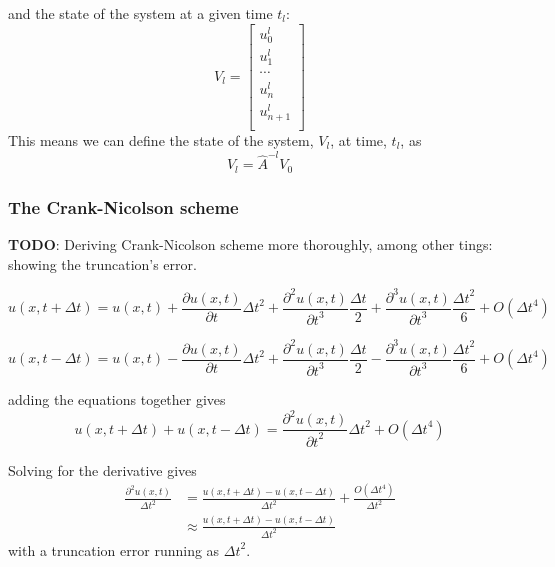 \documentclass[10pt,a4paper]{article}
\newcommand{\dt}{{\Delta t}}
\newcommand{\pt}{{\partial t}}
\newcommand{\pu}{{\partial u}}
\newcommand{\ppu}{{\partial^2 u}}
\newcommand{\pppu}{{\partial^3 u}}
\begin{document}
and the state of the system at a given time $t_l$:
\begin{equation}\label{eqn:V} V_l = \begin{bmatrix}
u_{0}^l\\
u_{1}^l\\
\cdots\\
u_{n}^l\\
u_{n+1}^l\\
\end{bmatrix}
\end{equation}
This means we can define the state of the system, $V_l$, at time, $t_l$, as
\begin{equation}
V_l = \hat{A}^{-l}V_0
\end{equation}



\subsubsection{The Crank-Nicolson scheme}
\textbf{TODO}: Deriving Crank-Nicolson scheme more thoroughly, among other tings: showing the truncation's error.

\begin{equation}
u(x,t+\dt) = u(x,t) + \frac{\pu(x,t)}{\pt}\dt^2 + \frac{\ppu(x,t)}{\pt^3}\frac{\dt}{2} + \frac{\pppu(x,t)}{\pt^3}\frac{\dt^2}{6} + O(\dt^4)
\end{equation}

\begin{equation}
u(x,t-\dt) = u(x,t) - \frac{\pu(x,t)}{\pt}\dt^2 + \frac{\ppu(x,t)}{\pt^3}\frac{\dt}{2} - \frac{\pppu(x,t)}{\pt^3}\frac{\dt^2}{6} + O(\dt^4)
\end{equation}

adding the equations together gives
\begin{equation}
u(x,t+\dt) + u(x,t-\dt) = \frac{\ppu(x,t)}{\pt^2}\dt^2 + O(\dt^4)
\end{equation}

Solving for the derivative gives
\begin{equation}\begin{split}
\frac{\ppu(x,t)}{\dt^2} &= \frac{u(x,t+\dt) - u(x,t-\dt)}{\dt^2} + \frac{O(\dt^4)}{\dt^2} \\
&\approx \frac{u(x,t+\dt) - u(x,t-\dt)}{\dt^2}
\end{split}\end{equation}
with a truncation error running as $\dt^2$.
\end{document}
